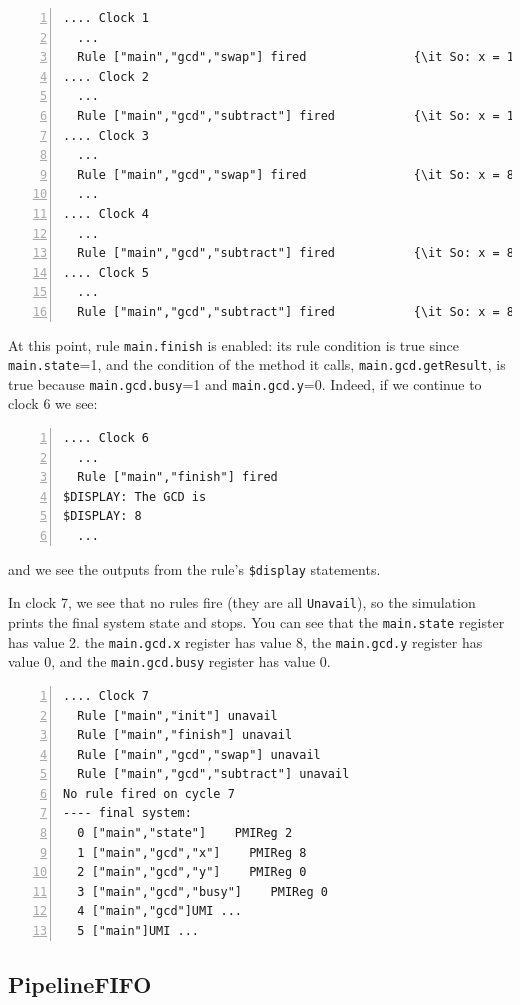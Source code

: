 \documentclass[11pt]{article}
\newcommand{\term}[1]{\texttt{#1}}
\begin{document}
\begin{Verbatim}[frame=single, numbers=left, commandchars=\\\{\}]
.... Clock 1
  ...
  Rule ["main","gcd","swap"] fired               {\it So: x = 16, y = 24}
.... Clock 2
  ...
  Rule ["main","gcd","subtract"] fired           {\it So: x = 16, y = 8}
.... Clock 3
  ...
  Rule ["main","gcd","swap"] fired               {\it So: x = 8, y = 16}
  ...
.... Clock 4
  ...
  Rule ["main","gcd","subtract"] fired           {\it So: x = 8, y = 8}
.... Clock 5
  ...
  Rule ["main","gcd","subtract"] fired           {\it So: x = 8, y = 0}
\end{Verbatim}

At this point, rule \term{main.finish} is enabled: its rule condition
is true since \term{main.state}=1, and the condition of the method it
calls, \term{main.gcd.getResult}, is true because
\term{main.gcd.busy}=1 and \term{main.gcd.y}=0.  Indeed, if we
continue to clock 6 we see:

\begin{Verbatim}[frame=single, numbers=left, commandchars=\\\{\}]
.... Clock 6
  ...
  Rule ["main","finish"] fired
$DISPLAY: The GCD is 
$DISPLAY: 8
  ...
\end{Verbatim}

and we see the outputs from the rule's \verb|$display| statements.

In clock 7, we see that no rules fire (they are all \term{Unavail}), so
the simulation prints the final system state and stops.  You can see
that the \term{main.state} register has value 2.
the \term{main.gcd.x} register has value 8,
the \term{main.gcd.y} register has value 0,
and the \term{main.gcd.busy} register has value 0.

\begin{Verbatim}[frame=single, numbers=left, commandchars=\\\{\}]
.... Clock 7
  Rule ["main","init"] unavail
  Rule ["main","finish"] unavail
  Rule ["main","gcd","swap"] unavail
  Rule ["main","gcd","subtract"] unavail
No rule fired on cycle 7
---- final system: 
  0 ["main","state"]    PMIReg 2
  1 ["main","gcd","x"]    PMIReg 8
  2 ["main","gcd","y"]    PMIReg 0
  3 ["main","gcd","busy"]    PMIReg 0
  4 ["main","gcd"]UMI ...
  5 ["main"]UMI ...
\end{Verbatim}


\subsection{PipelineFIFO}
\end{document}
